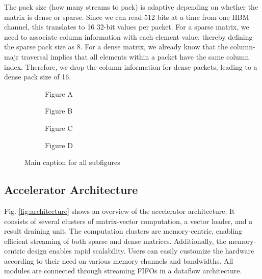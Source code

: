 \documentclass[manuscript,screen,review]{acmart}
\begin{document}
The pack size (how many streams to pack) is adaptive depending on whether the matrix is dense or sparse. Since we can read 512 bits at a time from one HBM channel, this translates to 16 32-bit values per packet. For a sparse matrix, we need to associate column information with each element value, thereby defining the sparse pack size as 8. For a dense matrix, we already know that the column-majr traversal implies that all elements within a packet have the same column index. Therefore, we drop the column information for dense packets, leading to a dense pack size of 16. 


\begin{figure}[h]
	\centering
	\begin{subfigure}[b]{0.8\textwidth}
		\centering
		
		\caption{Figure A}
		\label{fig:matrix-partition}
	\end{subfigure}
	\vspace{1em} %
	\begin{subfigure}[b]{0.8\textwidth}
		\centering
		
		\caption{Figure B}
		\label{fig:packets-channels}
	\end{subfigure}
	\vspace{1em} %
	\begin{subfigure}[b]{0.45\textwidth}
		\centering
		
		\caption{Figure C}
		\label{fig:sparse-padding}
	\end{subfigure}
	\hspace{1em} %
	\begin{subfigure}[b]{0.45\textwidth}
		\centering
		
		\caption{Figure D}
		\label{fig:cluster-distribution}
	\end{subfigure}
	\caption{Main caption for all subfigures}
	\label{fig:main}
\end{figure}

\subsection{Accelerator Architecture}
Fig. \ref{fig:architecture} shows an overview of the accelerator architecture. It consists of several clusters of matrix-vector computation, a vector loader, and a result draining unit. The computation clusters are memory-centric, enabling efficient streaming of both sparse and dense matrices. Additionally, the memory-centric design enables rapid scalability. Users can easily customize the hardware according to their need on various memory channels and bandwidths. All  modules are connected through streaming FIFOs in a dataflow architecture. 
\end{document}
